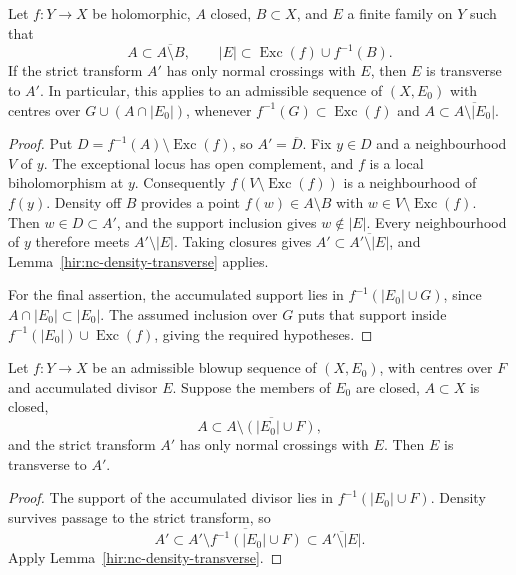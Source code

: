 \begin{lemma}
\label{hir:strict-transform-initial-boundary-transverse}
\leanok
Let \(f:Y\to X\) be holomorphic, \(A\) closed, \(B\subset X\), and \(E\) a finite family on \(Y\) such that
\[
 A\subset\overline{A\setminus B},\qquad
 |E|\subset\operatorname{Exc}(f)\cup f^{-1}(B).
\]
If the strict transform \(A'\) has only normal crossings with \(E\), then \(E\) is transverse to \(A'\). In particular, this applies to an admissible sequence of \((X,E_0)\) with centres over \(G\cup(A\cap|E_0|)\), whenever \(f^{-1}(G)\subset\operatorname{Exc}(f)\) and \(A\subset\overline{A\setminus|E_0|}\).
\end{lemma}
\begin{proof}
Put \(D=f^{-1}(A)\setminus\operatorname{Exc}(f)\), so \(A'=\overline D\). Fix \(y\in D\) and a neighbourhood \(V\) of \(y\). The exceptional locus has open complement, and \(f\) is a local biholomorphism at \(y\). Consequently \(f(V\setminus\operatorname{Exc}(f))\) is a neighbourhood of \(f(y)\). Density off \(B\) provides a point \(f(w)\in A\setminus B\) with \(w\in V\setminus\operatorname{Exc}(f)\). Then \(w\in D\subset A'\), and the support inclusion gives \(w\notin|E|\). Every neighbourhood of \(y\) therefore meets \(A'\setminus|E|\). Taking closures gives \(A'\subset\overline{A'\setminus|E|}\), and Lemma~\ref{hir:nc-density-transverse} applies.

For the final assertion, the accumulated support lies in \(f^{-1}(|E_0|\cup G)\), since \(A\cap|E_0|\subset|E_0|\). The assumed inclusion over \(G\) puts that support inside \(f^{-1}(|E_0|)\cup\operatorname{Exc}(f)\), giving the required hypotheses.
\end{proof}

\begin{lemma}
\label{hir:strict-transform-density-transverse}
\leanok
Let \(f:Y\to X\) be an admissible blowup sequence of \((X,E_0)\), with centres over \(F\) and accumulated divisor \(E\). Suppose the members of \(E_0\) are closed, \(A\subset X\) is closed,
\[
 A\subset\overline{A\setminus(|E_0|\cup F)},
\]
and the strict transform \(A'\) has only normal crossings with \(E\). Then \(E\) is transverse to \(A'\).
\end{lemma}
\begin{proof}
The support of the accumulated divisor lies in \(f^{-1}(|E_0|\cup F)\). Density survives passage to the strict transform, so
\[
 A'\subset\overline{A'\setminus f^{-1}(|E_0|\cup F)}
 \subset\overline{A'\setminus|E|}.
\]
Apply Lemma~\ref{hir:nc-density-transverse}.
\end{proof}

